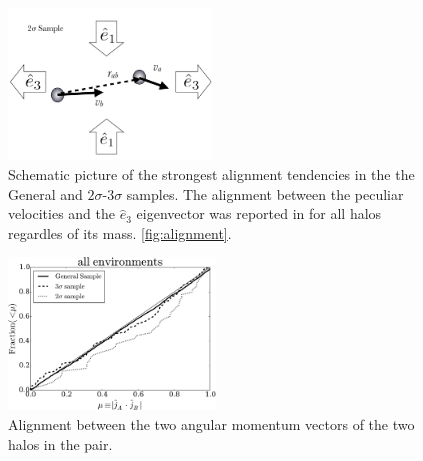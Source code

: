 \documentclass{emulateapj}
\begin{document}
\begin{figure}
  \begin{center}
    \includegraphics[width=0.48\textwidth]{scheme.pdf} 
    \caption{Schematic picture of the strongest alignment tendencies in
      the the General and $2\sigma$-$3\sigma$ samples. The alignment
      between the peculiar velocities and the $\hat{e}_3$ eigenvector was
      reported in \citet{ForeroRomero2014} for all halos regardles of its
      mass. 
      \ref{fig:alignment}. 
      \label{fig:scheme}}
  \end{center}
\end{figure}

\begin{figure}
\begin{center}
  \includegraphics[width=0.49\textwidth]{alignments_jj_all_environments.pdf}
\end{center}
\caption{Alignment between the two angular momentum vectors of the two
  halos in the pair.
    \label{fig:jj_alignment}}  
\end{figure}



\end{document}

